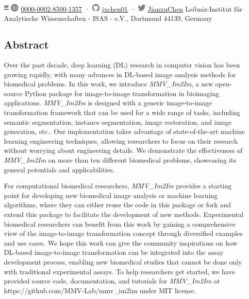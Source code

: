 \begin{itemize}
  \textsuperscript{\protect\hyperlink{correspondence}{✉}}
  \includegraphics[width=0.16667in,height=0.16667in]{images/orcid.svg}
  \href{https://orcid.org/0000-0002-8500-1357}{0000-0002-8500-1357}
  · \includegraphics[width=0.16667in,height=0.16667in]{images/github.svg}
  \href{https://github.com/jxchen01}{jxchen01}
  · \includegraphics[width=0.16667in,height=0.16667in]{images/twitter.svg}
  \href{https://twitter.com/JianxuChen}{JianxuChen}
  Leibniz-Institut für Analytische Wissenschaften - ISAS - e.V., Dortmund 44139, Germany
\end{itemize}

\hypertarget{abstract}{%
\subsection{Abstract}\label{abstract}}

Over the past decade, deep learning (DL) research in computer vision has been growing rapidly, with many advances in DL-based image analysis methods for biomedical problems. In this work, we introduce \emph{MMV\_Im2Im}, a new open-source Python package for image-to-image transformation in bioimaging applications. \emph{MMV\_Im2Im} is designed with a generic image-to-image transformation framework that can be used for a wide range of tasks, including semantic segmentation, instance segmentation, image restoration, and image generation, etc.. Our implementation takes advantage of state-of-the-art machine learning engineering techniques, allowing researchers to focus on their research without worrying about engineering details. We demonstrate the effectiveness of \emph{MMV\_Im2Im} on more than ten different biomedical problems, showcasing its general potentials and applicabilities.

For computational biomedical researchers, \emph{MMV\_Im2Im} provides a starting point for developing new biomedical image analysis or machine learning algorithms, where they can either reuse the code in this package or fork and extend this package to facilitate the development of new methods. Experimental biomedical researchers can benefit from this work by gaining a comprehensive view of the image-to-image transformation concept through diversified examples and use cases. We hope this work can give the community inspirations on how DL-based image-to-image transformation can be integrated into the assay development process, enabling new biomedical studies that cannot be done only with traditional experimental assays. To help researchers get started, we have provided source code, documentation, and tutorials for \emph{MMV\_Im2Im} at https://github.com/MMV-Lab/mmv\_im2im under MIT license.

